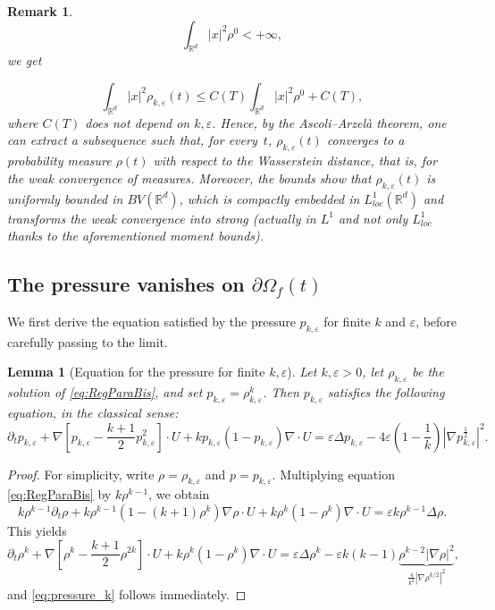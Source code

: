 \documentclass[11pt,twoside]{article}
\numberwithin{equation}{section}
\newcommand{\R}{\mathbb{R}}
\newcommand {\eps}  {\varepsilon}
\newcommand {\f}   {\frac}
\newcommand {\p}   {\partial}
\newtheorem{lemma}[theorem]{Lemma}
\newtheorem{remark}[theorem]{Remark}
\begin{document}
\begin{remark}
\[
\int_{\R^d} |x|^2\rho^0 < + \infty,
\]
we get

\[
\int_{\R^d} |x|^2\rho_{k,\eps}(t) \le C(T) \int_{\R^d} |x|^2\rho^0+ C(T),
\]
where $C(T)$ does not depend on $k,\eps$.
Hence, by the Ascoli--Arzelà theorem, one can extract a subsequence such that, for every~$t$, $\rho_{k,\eps}(t)$ converges to a probability measure $\rho(t)$ with respect to the Wasserstein distance, that is, for the weak convergence of measures. Moreover, the bounds show that $\rho_{k,\eps}(t)$ is uniformly bounded in $BV(\R^d)$, which is compactly embedded in $L^1_{loc}(\R^d)$ and transforms the weak convergence into strong (actually in $L^1$ and not only $L^1_{loc}$ thanks to the aforementioned moment bounds).
\end{remark}

\subsection{The pressure vanishes on $\partial \Omega_f(t)$}

We first derive the equation satisfied by the pressure $p_{k,\eps}$ for finite $k$ and $\eps$, before carefully passing to the limit.

\begin{lemma}[Equation for the pressure for finite $k,\eps$]
Let $k,\eps >0$, let $\rho_{k,\eps}$ be the solution of \eqref{eq:RegParaBis}, and set $p_{k,\eps} = \rho_{k,\eps}^k$. Then $p_{k,\eps}$ satisfies the following equation, in the classical sense:
\begin{equation}
\label{eq:pressure_k}
\p_t p_{k,\eps} + \nabla\!\left[p_{k,\eps}-\f{k+1}{2}p_{k,\eps}^2\right]\!\cdot U 
+ k p_{k,\eps}(1-p_{k,\eps}) \nabla \cdot U 
= \eps \Delta p_{k,\eps} 
- 4\eps \left(1-\f1k\right)\!\left|\nabla p_{k,\eps}^{\f12}\right|^2.
\end{equation}
\end{lemma}

\begin{proof}
For simplicity, write $\rho=\rho_{k,\eps}$ and $p=p_{k,\eps}$. 
Multiplying equation \eqref{eq:RegParaBis} by $k\rho^{k-1}$, we obtain
\[
k\rho^{k-1}\p_t\rho 
+ k\rho^{k-1}(1-(k+1)\rho^k)\nabla \rho \cdot U 
+ k \rho^k(1-\rho^k)\nabla \cdot U 
= \eps k\rho^{k-1}\Delta \rho.
\]
This yields
\[
\p_t \rho^k 
+ \nabla \!\left[ \rho^k - \f{k+1}{2}\rho^{2k}\right]\!\cdot U 
+ k \rho^k(1-\rho^k) \nabla \cdot U 
= \eps \Delta \rho^k 
- \eps k(k-1)\underbrace{\rho^{k-2}|\nabla \rho |^2}_{\f{4}{k^2}|\nabla \rho ^{k/2}|^2},
\]
and \eqref{eq:pressure_k} follows immediately.
\end{proof}
\end{document}
